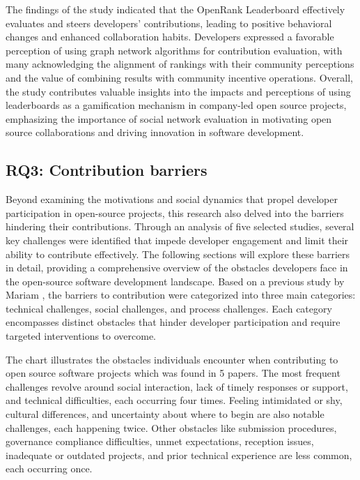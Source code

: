 The findings of the study indicated that the OpenRank Leaderboard effectively evaluates and steers developers' contributions, leading to positive behavioral changes and enhanced collaboration habits. Developers expressed a favorable perception of using graph network algorithms for contribution evaluation, with many acknowledging the alignment of rankings with their community perceptions and the value of combining results with community incentive operations. Overall, the study contributes valuable insights into the impacts and perceptions of using leaderboards as a gamification mechanism in company-led open source projects, emphasizing the importance of social network evaluation in motivating open source collaborations and driving innovation in software development.


\subsection{RQ3: Contribution barriers}

Beyond examining the motivations and social dynamics that propel developer participation in open-source projects, this research also delved into the barriers hindering their contributions. Through an analysis of five selected studies, several key challenges were identified that impede developer engagement and limit their ability to contribute effectively. The following sections will explore these barriers in detail, providing a comprehensive overview of the obstacles developers face in the open-source software development landscape. Based on a previous study by Mariam \cite{04guizani2021long}, the barriers to contribution were categorized into three main categories: technical challenges, social challenges, and process challenges. Each category encompasses distinct obstacles that hinder developer participation and require targeted interventions to overcome.


The chart illustrates the obstacles individuals encounter when contributing to open source software projects which was found in 5 papers. The most frequent challenges revolve around social interaction, lack of timely responses or support, and technical difficulties, each occurring four times. Feeling intimidated or shy, cultural differences, and uncertainty about where to begin are also notable challenges, each happening twice. Other obstacles like submission procedures, governance compliance difficulties, unmet expectations, reception issues, inadequate or outdated projects, and prior technical experience are less common, each occurring once.

